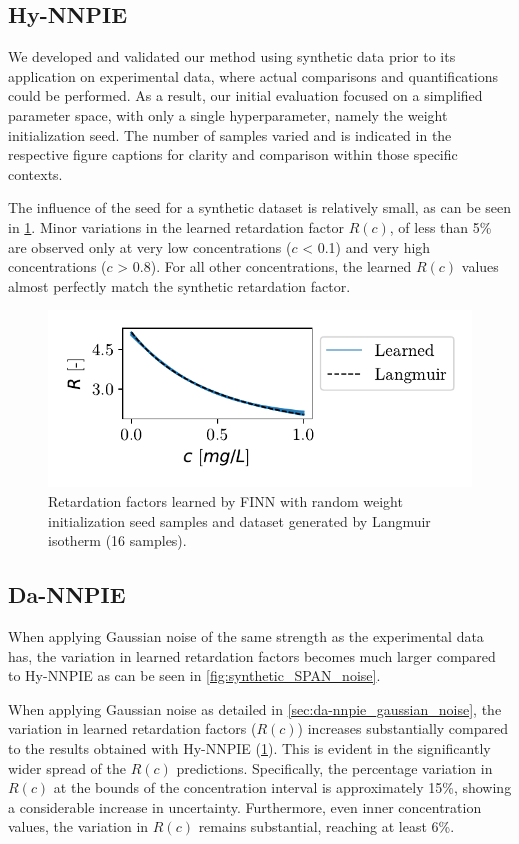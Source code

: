 \subsection{Hy-NNPIE}
We developed and validated our method using synthetic data prior to its application on experimental data, where actual comparisons and quantifications could be performed. As a result, our initial evaluation focused on a simplified parameter space, with only a single hyperparameter, namely the weight initialization seed.
The number of samples varied and is indicated in the respective figure captions for clarity and comparison within those specific contexts.

The influence of the seed for a synthetic dataset is relatively small, as can be seen in \cref{fig:synthetic_SPAN_seed}. Minor variations in the learned retardation factor $R(c)$, of less than 5\% are observed only at very low concentrations ($c$ < 0.1) and very high concentrations ($c$ > 0.8). For all other concentrations, the learned $R(c)$ values almost perfectly match the synthetic retardation factor.


\begin{figure}[h]
    \centering
    \includegraphics{figs/finn_synthetic_SPAN_seed.pdf}
    \caption{Retardation factors learned by FINN with random weight initialization seed samples and dataset generated by Langmuir isotherm (16 samples).}
    \label{fig:synthetic_SPAN_seed}
\end{figure}



\subsection{Da-NNPIE}
When applying Gaussian noise of the same strength as the experimental data has, the variation in learned retardation factors becomes much larger compared to Hy-NNPIE as can be seen in \cref{fig:synthetic_SPAN_noise}.

When applying Gaussian noise as detailed in \cref{sec:da-nnpie_gaussian_noise}, the variation in learned retardation factors ($R(c)$) increases substantially compared to the results obtained with Hy-NNPIE (\cref{fig:synthetic_SPAN_seed}). This is evident in the significantly wider spread of the $R(c)$ predictions. Specifically, the percentage variation in $R(c)$ at the bounds of the concentration interval is approximately 15\%, showing a considerable increase in uncertainty. Furthermore, even inner concentration values, the variation in $R(c)$ remains substantial, reaching at least 6\%.


